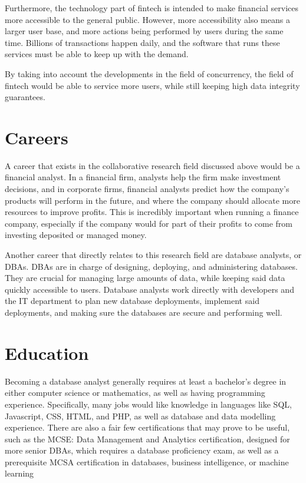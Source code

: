 \documentclass[jou]{apa7}
\begin{document}
Furthermore, the technology part of fintech is intended to make financial services more accessible to the general public.
However, more accessibility also means a larger user base,
and more actions being performed by users during the same time.
Billions of transactions happen daily,
and the software that runs these services must be able to keep up with the demand.
\autocite{foggSoftwareTestingFintech2020}

By taking into account the developments in the field of concurrency,
the field of fintech would be able to service more users,
while still keeping high data integrity guarantees.

\section{Careers}
A career that exists in the collaborative research field discussed above would be a financial analyst.
In a financial firm, analysts help the firm make investment decisions,
and in corporate firms,
financial analysts predict how the company's products will perform in the future,
and where the company should allocate more resources to improve profits.
This is incredibly important when running a finance company,
especially if the company would for part of their profits to come from investing deposited or managed money.
\autocite{segalBecomingFinancialAnalyst2020}

Another career that directly relates to this research field are database analysts, or DBAs.
DBAs are in charge of designing, deploying, and administering databases.
They are crucial for managing large amounts of data,
while keeping said data quickly accessible to users.
Database analysts work directly with developers and the IT department to plan new database deployments,
implement said deployments,
and making sure the databases are secure and performing well.
\autocite{jobheroDatabaseAnalystJob2020}

\section{Education}
Becoming a database analyst generally requires at least a bachelor's degree in either computer science or mathematics,
as well as having programming experience.
\autocite{governmentofcanadaDatabaseAnalystCanada2020}
Specifically, many jobs would like knowledge in languages like
SQL, Javascript, CSS, HTML, and PHP, as well as database and data modelling experience.
\autocite{jobheroDatabaseAnalystJob2020}
There are also a fair few certifications that may prove to be useful,
such as the MCSE: Data Management and Analytics certification,
designed for more senior DBAs,
which requires a database proficiency exam,
as well as a prerequisite MCSA certification in databases,
business intelligence,
or machine learning
\autocite{aroraBestDataAnalytics2020}

\printbibliography
\end{document}
